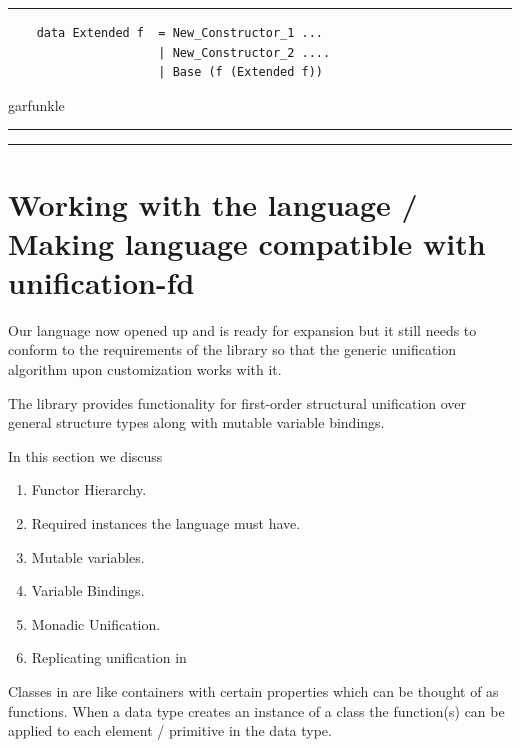 \documentclass[thesis-solanki.tex]{subfiles}
\begin{document}
\begin{code-list}[h]
  \rule{0.98\textwidth}{0.3pt}
  \begin{verbatim}
    data Extended f  = New_Constructor_1 ...
                     | New_Constructor_2 ....
                     | Base (f (Extended f))
  \end{verbatim}
  \caption{garfunkle}
  \label{tab:garfunkle}
  \rule{0.98\textwidth}{0.3pt}
\end{code-list}

\noindent\textcolor{blue}{\rule{\0.95\textwidth}{0.25pt}}

\section{Working with the language / Making language compatible with unification-fd}

Our language now opened up and is ready for expansion but it still needs to conform to the requirements of the \cite{unification-fd-lib}
library so that the generic unification algorithm upon customization works with it.

The library provides functionality for first-order structural unification over general structure types along with mutable variable
bindings.

In this section we discuss
\begin{enumerate}
\item Functor Hierarchy.

\item Required instances the language must have.

\item Mutable variables.

\item Variable Bindings.

\item Monadic Unification.

\item Replicating  unification in 
\end{enumerate}

Classes in  are like containers with certain properties which can be thought of as functions. When a data type creates an
instance of a class the function(s) can be applied to each element / primitive in the data type.
\end{document}
